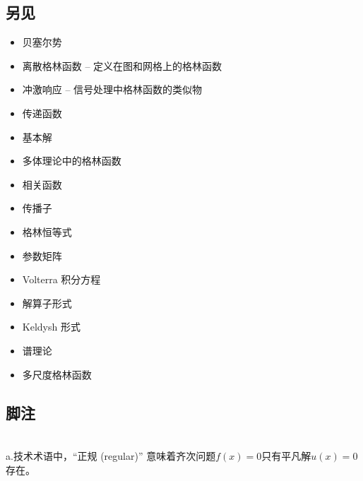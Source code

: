 \subsection{另见}
\begin{itemize}
\item 贝塞尔势 
\item 离散格林函数 – 定义在图和网格上的格林函数
\item 冲激响应 – 信号处理中格林函数的类似物
\item 传递函数
\item 基本解 
\item 多体理论中的格林函数 
\item 相关函数 
\item 传播子
\item 格林恒等式
\item 参数矩阵
\item Volterra 积分方程
\item 解算子形式 
\item Keldysh 形式 
\item 谱理论 
\item 多尺度格林函数
\end{itemize}
\subsection{脚注}\\
a.技术术语中，“正规 (regular)” 意味着齐次问题$f(x) = 0$只有平凡解$u(x) = 0$存在。
